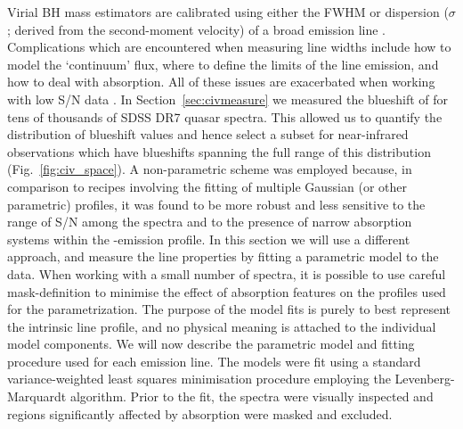 Virial BH mass estimators are calibrated using either the FWHM or dispersion ($\sigma$; derived from the second-moment velocity) of a broad emission line \citep[e.g.][]{vestergaard06,park13}. 
Complications which are encountered when measuring line widths include how to model the `continuum' flux, where to define the limits of the line emission, and how to deal with absorption. 
All of these issues are exacerbated when working with low S/N data \citep[see][for a discussion]{denney13}. 
In Section~\ref{sec:civmeasure} we measured the blueshift of  for tens of thousands of SDSS DR7 quasar spectra. 
This allowed us to quantify the distribution of  blueshift values and hence select a subset for near-infrared observations which have  blueshifts spanning the full range of this distribution (Fig.~\ref{fig:civ_space}).
A non-parametric scheme was employed because, in comparison to recipes involving the fitting of multiple Gaussian (or other parametric) profiles, it was found to be more robust and less sensitive to the range of S/N among the spectra and to the presence of narrow absorption systems within the -emission profile.
In this section we will use a different approach, and measure the line properties by fitting a parametric model to the data. 
When working with a small number of spectra, it is possible to use careful mask-definition to minimise the effect of absorption features on the profiles used for the parametrization.
The purpose of the model fits is purely to best represent the intrinsic line profile, and no physical meaning is attached to the individual model components. 
We will now describe the parametric model and fitting procedure used for each emission line. 
The models were fit using a standard variance-weighted least squares minimisation procedure employing the Levenberg-Marquardt algorithm. 
Prior to the fit, the spectra were visually inspected and regions significantly affected by absorption were masked and excluded.

\subsection{}
\label{sec:civ}

